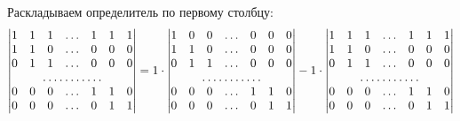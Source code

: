 \documentclass[a4paper,12pt]{article}
\begin{document}
  \begin{solution}
    Раскладываем определитель по первому столбцу:
    \[
      \begin{vmatrix}
        1 & 1 & 1 & \ldots & 1 & 1 & 1\\
        1 & 1 & 0 & \ldots & 0 & 0 & 0\\
        0 & 1 & 1 & \ldots & 0 & 0 & 0\\
        \hdotsfor{7}\\
        0 & 0 & 0 & \ldots & 1 & 1 & 0\\
        0 & 0 & 0 & \ldots & 0 & 1 & 1
      \end{vmatrix}
      = 1 \cdot \begin{vmatrix}
          1 & 0 & 0 & \ldots & 0 & 0 & 0\\
          1 & 1 & 0 & \ldots & 0 & 0 & 0\\
          0 & 1 & 1 & \ldots & 0 & 0 & 0\\
          \hdotsfor{7}\\
          0 & 0 & 0 & \ldots & 1 & 1 & 0\\
          0 & 0 & 0 & \ldots & 0 & 1 & 1
        \end{vmatrix}
        - 1 \cdot \begin{vmatrix}
          1 & 1 & 1 & \ldots & 1 & 1 & 1\\
          1 & 1 & 0 & \ldots & 0 & 0 & 0\\
          0 & 1 & 1 & \ldots & 0 & 0 & 0\\
          \hdotsfor{7}\\
          0 & 0 & 0 & \ldots & 1 & 1 & 0\\
          0 & 0 & 0 & \ldots & 0 & 1 & 1
        \end{vmatrix}
    \]
    

\end{solution}
\end{document}
